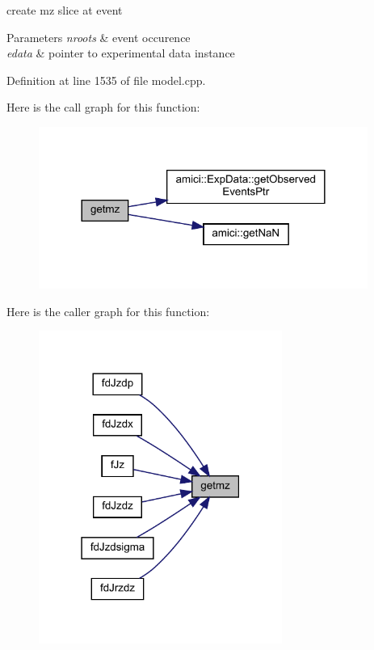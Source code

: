 create mz slice at event 
\begin{DoxyParams}{Parameters}
{\em nroots} & event occurence \\
\hline
{\em edata} & pointer to experimental data instance \\
\hline
\end{DoxyParams}


Definition at line 1535 of file model.\+cpp.

Here is the call graph for this function\+:
\nopagebreak
\begin{figure}[H]
\begin{center}
\leavevmode
\includegraphics[width=305pt]{classamici_1_1_model_a523a7d80e06bfab324d566dd6032abcf_cgraph}
\end{center}
\end{figure}
Here is the caller graph for this function\+:
\nopagebreak
\begin{figure}[H]
\begin{center}
\leavevmode
\includegraphics[width=226pt]{classamici_1_1_model_a523a7d80e06bfab324d566dd6032abcf_icgraph}
\end{center}
\end{figure}
\mbox{\label{classamici_1_1_model_aee6c7b534a091180c01aabb3be44a216}} 
